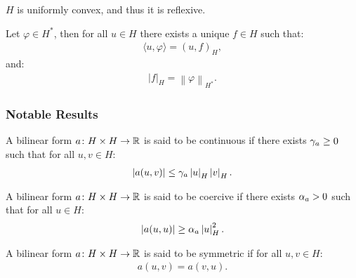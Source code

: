\begin{theorem}
    $H$ is uniformly convex, and thus it is reflexive.
\end{theorem}

\begin{theorem}
    Let $\varphi \in H^*$, then for all $u \in H$ there exists a unique $f \in H$ such that:
    \begin{align}
        \langle u, \varphi \rangle = (u, f)_H,
    \end{align}
    and:
    \begin{align}
        \left\lvert f \right\rvert_H = \left\lVert \varphi \right\rVert_{H^*}.
    \end{align}
\end{theorem}

\newpage
\subsubsection{Notable Results}

\begin{definition}
    A bilinear form $a \colon H \times H \rightarrow \mathbb{R}$ is said to be continuous if there exists $\gamma_{a} \geq 0$ such that for all $u, v \in H$:
    \begin{align}
        \left\lvert a(u, v) \right\rvert \leq \gamma_{a} \left\lvert u \right\rvert_H \left\lvert v \right\rvert_H.
    \end{align}
\end{definition}

\begin{definition}
    A bilinear form $a \colon H \times H \rightarrow \mathbb{R}$ is said to be coercive if there exists $\alpha_{a} > 0$ such that for all $u \in H$:
    \begin{align}
        \left\lvert a(u, u) \right\rvert \geq \alpha_{a} \left\lvert u \right\rvert_H^2.
    \end{align}
\end{definition}

\begin{definition}
    A bilinear form $a \colon H \times H \rightarrow \mathbb{R}$ is said to be symmetric if for all $u, v \in H$:
    \begin{align}
        a(u, v) = a(v, u).
    \end{align}
\end{definition}

